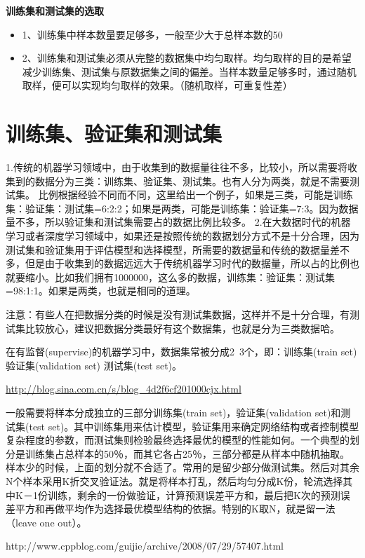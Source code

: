 \documentclass[10pt,a4paper]{ctexbook}
\begin{document}
\textbf{训练集和测试集的选取}
\begin{itemize}
\item 1、训练集中样本数量要足够多，一般至少大于总样本数的50%
\item 2、训练集和测试集必须从完整的数据集中均匀取样。均匀取样的目的是希望减少训练集、测试集与原数据集之间的偏差。当样本数量足够多时，通过随机取样，便可以实现均匀取样的效果。（随机取样，可重复性差）
\end{itemize}


\section{训练集、验证集和测试集}
1.传统的机器学习领域中，由于收集到的数据量往往不多，比较小，所以需要将收集到的数据分为三类：训练集、验证集、测试集。也有人分为两类，就是不需要测试集。
比例根据经验不同而不同，这里给出一个例子，如果是三类，可能是训练集：验证集：测试集=6:2:2；如果是两类，可能是训练集：验证集=7:3。因为数据量不多，所以验证集和测试集需要占的数据比例比较多。
2.在大数据时代的机器学习或者深度学习领域中，如果还是按照传统的数据划分方式不是十分合理，因为测试集和验证集用于评估模型和选择模型，所需要的数据量和传统的数据量差不多，但是由于收集到的数据远远大于传统机器学习时代的数据量，所以占的比例也就要缩小。比如我们拥有1000000，这么多的数据，训练集：验证集：测试集=98:1:1。如果是两类，也就是相同的道理。

注意：有些人在把数据分类的时候是没有测试集数据，这样并不是十分合理，有测试集比较放心，建议把数据分类最好有这个数据集，也就是分为三类数据哈。



在有监督(supervise)的机器学习中，数据集常被分成2~3个，即：训练集(train set) 验证集(validation set) 测试集(test set)。

\url{http://blog.sina.com.cn/s/blog_4d2f6cf201000cjx.html}

一般需要将样本分成独立的三部分训练集(train set)，验证集(validation set)和测试集(test set)。其中训练集用来估计模型，验证集用来确定网络结构或者控制模型复杂程度的参数，而测试集则检验最终选择最优的模型的性能如何。一个典型的划分是训练集占总样本的50％，而其它各占25％，三部分都是从样本中随机抽取。
样本少的时候，上面的划分就不合适了。常用的是留少部分做测试集。然后对其余N个样本采用K折交叉验证法。就是将样本打乱，然后均匀分成K份，轮流选择其中K－1份训练，剩余的一份做验证，计算预测误差平方和，最后把K次的预测误差平方和再做平均作为选择最优模型结构的依据。特别的K取N，就是留一法（leave one out）。

http://www.cppblog.com/guijie/archive/2008/07/29/57407.html
\end{document}
